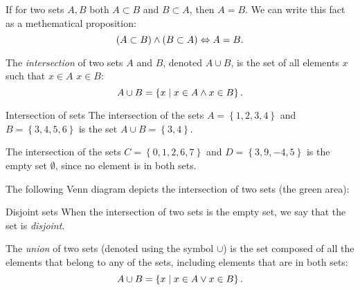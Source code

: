 If for two sets $A,B$ both $A\subset B$ and $B\subset A$, then $A=B$. We can write this fact as a methematical proposition:
\begin{equation}
	(A\subset B) \wedge (B\subset A) \Leftrightarrow A=B.
	\label{eq:subset_equal}
\end{equation}

The \emph{intersection} of two sets $A$ and $B$, denoted $A\cup B$, is the set of all elements $x$ such that $x\in A$ \AND{} $x\in B$:
\begin{equation}
	A\cup B = \left\{ x \mid x\in A \wedge x\in B \right\}.
	\label{eq:intersection}
\end{equation}

\begin{example}{Intersection of sets}{}
	The intersection of the sets $A=\left\{ 1,2,3,4 \right\}$ and $B=\left\{ 3,4,5,6 \right\}$ is the set $A\cup B=\left\{ 3,4 \right\}$.

	The intersection of the sets $C=\left\{ 0,1,2,6,7 \right\}$ and $D=\left\{ 3,9,-4,5 \right\}$ is the empty set $\emptyset$, since no element is in both sets.
\end{example}
  
The following Venn diagram depicts the intersection of two sets (the green area):
\begin{figure}
	\centering
\end{figure}

\begin{note}{Disjoint sets}{}
	When the intersection of two sets is the empty set, we say that the set is \emph{disjoint}.
\end{note}

The \emph{union} of two sets (denoted using the symbol $\cup$) is the set composed of all the elements that belong to any of the sets, including elements that are in both sets:
\begin{equation}
	A\cup B = \left\{ x \mid x\in A \vee x\in B \right\}.
	\label{eq:union}
\end{equation}

